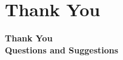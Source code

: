 \documentclass[10pt, aspectratio=169,t,xcolor=table]{beamer}
\begin{document}
\section{Thank You}
\begin{frame}
	\centering
	\vspace{3.5cm}
	\textbf{\Huge Thank You} \\
	\vspace{1cm}
	\textbf{Questions and Suggestions}
\end{frame}
\end{document}
